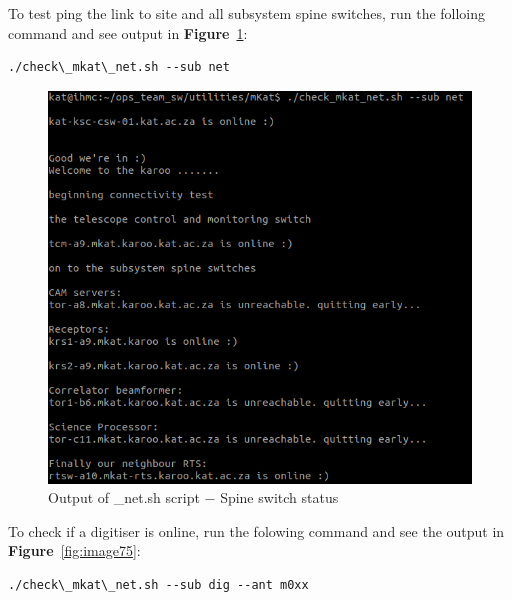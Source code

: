 To test ping the link to site and all subsystem spine switches, run the folloing command and see output in \textbf{Figure}~\ref{fig:image117}:
\begin{lstlisting}[style=DOS]
./check\_mkat\_net.sh --sub net

\end{lstlisting}



\begin{figure}[H]
	\centering
	\includegraphics[scale=0.53]{Chapters/images/image117.png}
	
	\caption{Output of \_net.sh script $-$ Spine switch status}
	\label{fig:image117}
\end{figure}


To check if a digitiser is online, run the folowing command and see the output in \textbf{Figure}~\ref{fig:image75}:
\begin{lstlisting}[style=DOS]
./check\_mkat\_net.sh --sub dig --ant m0xx
\end{lstlisting}




